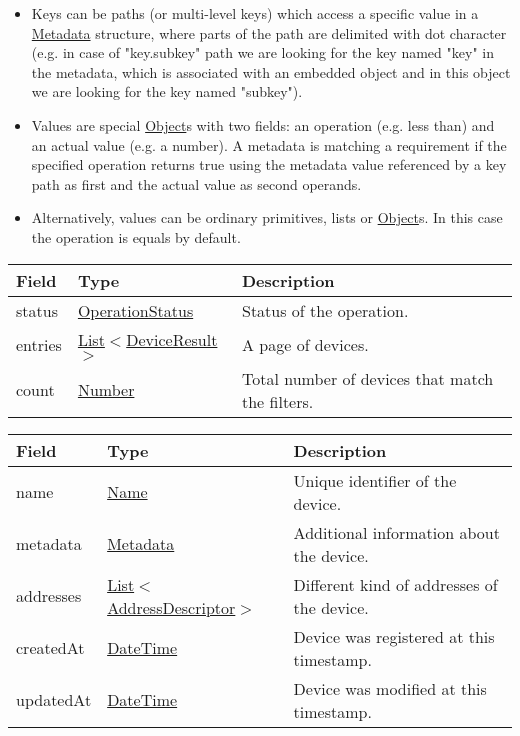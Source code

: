 \documentclass[a4paper]{arrowhead}
\newcommand{\pref}[1]{{\textcolor{ArrowheadGrey}{\hyperref[sec:model:primitives:#1]{#1}}}}
\begin{document}
\begin{itemize}
    \item Keys can be paths (or multi-level keys) which access a specific value in a \hyperref[sec:model:Metadata]{Metadata} structure, where parts of the path are delimited with dot character (e.g. in case of "key.subkey" path we are looking for the key named "key" in the metadata, which is associated with an embedded object and in this object we are looking for the key named "subkey").
    \item Values are special \pref{Object}s with two fields: an operation (e.g. less than) and an actual value (e.g. a number). A metadata is matching a requirement if the specified operation returns true using the metadata value referenced by a key path as first and the actual value as second operands. 
    \item Alternatively, values can be ordinary primitives, lists or \pref{Object}s. In this case the operation is equals by default.
\end{itemize}


\begin{table}[ht!]
\begin{tabularx}{\textwidth}{| p{2.5cm} | p{3.1cm} | X |} \hline
\rowcolor{gray!33} Field & Type      & Description \\ \hline
status & \pref{OperationStatus} & Status of the operation. \\ \hline
entries & \pref{List}$<$\hyperref[sec:model:DeviceResult]{DeviceResult}$>$ & A page of devices. \\ \hline
count & \pref{Number} & Total number of devices that match the filters. \\ \hline
\end{tabularx}
\end{table}

 
\begin{table}[ht!]
\begin{tabularx}{\textwidth}{| p{2.5cm} | p{4cm} | X |} \hline
\rowcolor{gray!33} Field & Type      & Description \\ \hline
name & \pref{Name} & Unique identifier of the device. \\ \hline
metadata & \hyperref[sec:model:Metadata]{Metadata} & Additional information about the device. \\ \hline
addresses &  \pref{List}$<$\hyperref[sec:model:AddressDescriptor]{AddressDescriptor}$>$ & Different kind of addresses of the device.  \\ \hline
createdAt & \pref{DateTime} & Device was registered at this timestamp. \\ \hline
updatedAt & \pref{DateTime} & Device was modified at this timestamp. \\ \hline
\end{tabularx}
\end{table}
\end{document}
